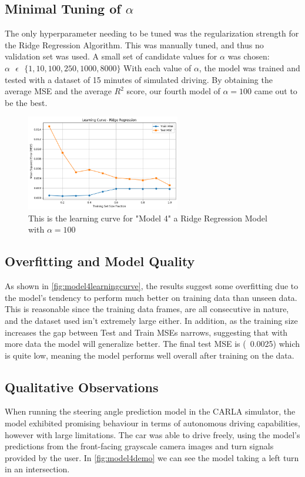\documentclass{article} %
\begin{document}
\subsection{Minimal Tuning of $\alpha$}
The only hyperparameter needing to be tuned was the regularization strength for the Ridge Regression Algorithm. This was manually tuned,
and thus no validation set was used. A small set of candidate values for $\alpha$ was chosen: $\alpha \text{ } \epsilon \text{ }
    \{ 1, 10, 100, 250, 1000, 8000\}$ With each value of $\alpha$, the model was trained and tested with a dataset of 15 minutes of simulated
driving. By obtaining the average MSE and the average $R^2$ score, our fourth model of $\alpha = 100$ came out to be the best.


\begin{figure}[H] %
    \centering
    \includegraphics[width=0.6\textwidth]{model4learningcurve.png} %
    \caption{This is the learning curve for "Model 4" a Ridge Regression Model with $\alpha = 100$}
    \label{fig:model4learningcurve}
\end{figure}

\subsection{Overfitting and Model Quality}
As shown in \autoref{fig:model4learningcurve}, the results suggest some overfitting due to the model's tendency
to perform much better on training data than unseen data. This is reasonable since the training data frames,
are all consecutive in nature, and the dataset used isn't extremely large either. In addition, as the training size
increases the gap between Test and Train MSEs narrows, suggesting that with more data the model will generalize better.
The final test MSE is (~0.0025) which is quite low, meaning the model performs well overall after training on the data.


\subsection{Qualitative Observations}
When running the steering angle prediction model in the CARLA simulator, the model exhibited promising behaviour in terms of
autonomous driving capabilities, however with large limitations. The car was able to drive freely, using the model's predictions
from the front-facing grayscale camera images and turn signals provided by the user. In \autoref{fig:model4demo} we can see
the model taking a left turn in an intersection.
\end{document}

